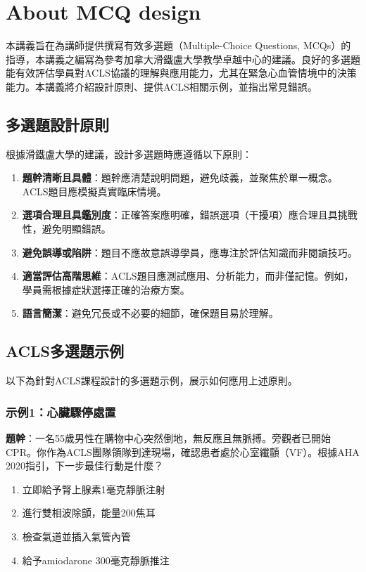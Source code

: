 \documentclass[12pt,a4paper]{article}
\begin{document}
\section{About MCQ design}
本講義旨在為講師提供撰寫有效多選題（Multiple-Choice Questions, MCQs）的指導，本講義之編寫為參考加拿大滑鐵盧大學教學卓越中心的建議。良好的多選題能有效評估學員對ACLS協議的理解與應用能力，尤其在緊急心血管情境中的決策能力。本講義將介紹設計原則、提供ACLS相關示例，並指出常見錯誤。

\subsection{多選題設計原則}
根據滑鐵盧大學的建議，設計多選題時應遵循以下原則：

\begin{enumerate}
    \item \textbf{題幹清晰且具體}：題幹應清楚說明問題，避免歧義，並聚焦於單一概念。ACLS題目應模擬真實臨床情境。
    \item \textbf{選項合理且具鑑別度}：正確答案應明確，錯誤選項（干擾項）應合理且具挑戰性，避免明顯錯誤。
    \item \textbf{避免誤導或陷阱}：題目不應故意誤導學員，應專注於評估知識而非閱讀技巧。
    \item \textbf{適當評估高階思維}：ACLS題目應測試應用、分析能力，而非僅記憶。例如，學員需根據症狀選擇正確的治療方案。
    \item \textbf{語言簡潔}：避免冗長或不必要的細節，確保題目易於理解。
\end{enumerate}

\subsection{ACLS多選題示例}
以下為針對ACLS課程設計的多選題示例，展示如何應用上述原則。

\subsubsection{示例1：心臟驟停處置}
\textbf{題幹}：一名55歲男性在購物中心突然倒地，無反應且無脈搏。旁觀者已開始CPR。你作為ACLS團隊領隊到達現場，確認患者處於心室纖顫（VF）。根據AHA 2020指引，下一步最佳行動是什麼？

\begin{enumerate}[label=\Alph*.]
    \item 立即給予腎上腺素1毫克靜脈注射
    \item 進行雙相波除顫，能量200焦耳
    \item 檢查氣道並插入氣管內管
    \item 給予amiodarone 300毫克靜脈推注
\end{enumerate}
\end{document}
